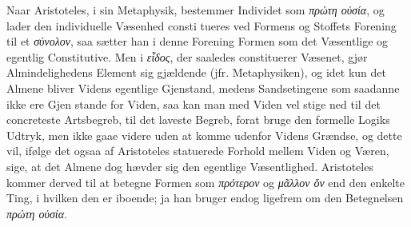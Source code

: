 \documentclass[12pt,a4paper]{book}
\newcommand{\gk}[1]{\textit{#1}}
\begin{document}
Naar Aristoteles, i sin Metaphysik, bestemmer Individet
som \gk{πρώτη οὐσία}, og lader den individuelle Væsenhed consti\-%
tueres ved Formens og Stoffets Forening til et \gk{σύνολον}, saa
sætter han i denne Forening Formen som det Væsentlige og
egentlig Constitutive. Men i \gk{εἶδος}, der saaledes constituerer
Væsenet, gjør Almindelighedens Element sig gjældende (jfr.
Metaphysiken), og idet kun det Almene bliver Videns egentlige
Gjenstand, medens Sandsetingene som saadanne ikke ere Gjen\-%
stande for Viden, saa kan man med Viden vel stige ned til
det concreteste Artsbegreb, til det laveste Begreb, forat bruge
den formelle Logiks Udtryk, men ikke gaae videre uden at
komme udenfor Videns Grændse, og dette vil, ifølge det ogsaa
af Aristoteles statuerede Forhold mellem Viden og Væren, sige,
at det Almene dog hævder sig den egentlige Væsentlighed.
Aristoteles kommer derved til at betegne Formen som \gk{πρότερον}
og \gk{μᾶλλον ὄν} end den enkelte Ting, i hvilken den er iboende;
ja han bruger endog ligefrem om den Betegnelsen \gk{πρώτη οὐσία}.
\end{document}
